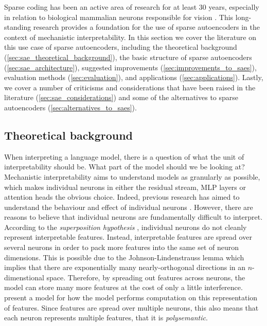 Sparse coding has been an active area of research for at least 30 years, especially in relation to biological mammalian neurons responsible for vision \parencite{olshausen_sparse_1997}\parencite{lee_efficient_2006}.
This long-standing research provides a foundation for the use of sparse autoencoders in the context of mechanistic interpretability.
In this section we cover the literature on this use case of sparse autoencoders, including the theoretical background (\autoref{sec:sae_theoretical_background}), the basic structure of sparse autoencoders (\autoref{sec:sae_architecture}), suggested improvements (\autoref{sec:improvements_to_saes}), evaluation methods (\autoref{sec:evaluation}), and applications (\autoref{sec:applications}).
Lastly, we cover a number of criticisms and considerations that have been raised in the literature (\autoref{sec:sae_considerations}) and some of the alternatives to sparse autoencoders (\autoref{sec:alternatives_to_saes}).

\subsection{Theoretical background}
\label{sec:sae_theoretical_background}
When interpreting a language model, there is a question of what the unit of interpretability should be.
What part of the model should we be looking at?
Mechanistic interpretability aims to understand models as granularly as possible, which makes individual neurons in either the residual stream, MLP layers or attention heads the obvious choice.
Indeed, previous research has aimed to understand the behaviour and effect of individual neurons \parencite{foote_neuron_2023}\parencite{bills_language_2023}.
However, there are reasons to believe that individual neurons are fundamentally difficult to interpret.
According to the \emph{superposition hypothesis} \parencite{elhage_toy_2022}, individual neurons do not cleanly represent interpretable features.
Instead, interpretable features are spread over several neurons in order to pack more features into the same set of neuron dimensions.
This is possible due to the Johnson-Lindenstrauss lemma which implies that there are exponentially many nearly-orthogonal directions in an $n$-dimenstional space.
Therefore, by spreading out features across neurons, the model can store many more features at the cost of only a little interference.
\textcite{vaintrob_toward_2024} present a model for how the model performs computation on this representation of features.
Since features are spread over multiple neurons, this also means that each neuron represents multiple features, that it is \emph{polysemantic}.

